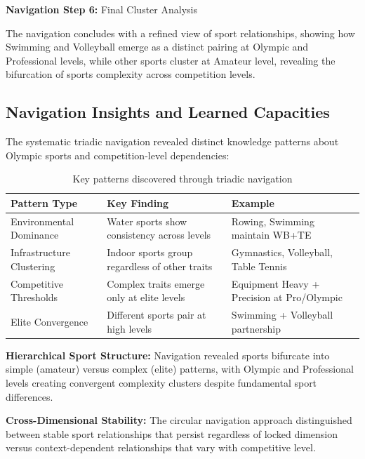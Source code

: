 \documentclass{article}
\begin{document}
\textbf{Navigation Step 6:} Final Cluster Analysis

The navigation concludes with a refined view of sport relationships, showing how Swimming and Volleyball emerge as a distinct pairing at Olympic and Professional levels, while other sports cluster at Amateur level, revealing the bifurcation of sports complexity across competition levels.

\subsection*{Navigation Insights and Learned Capacities}

The systematic triadic navigation revealed distinct knowledge patterns about Olympic sports and competition-level dependencies:

\begin{table}[h]
\centering
\begin{tabular}{|p{3cm}|p{4cm}|p{4cm}|}
\hline
\textbf{Pattern Type} & \textbf{Key Finding} & \textbf{Example} \\
\hline
Environmental Dominance & Water sports show consistency across levels & Rowing, Swimming maintain WB+TE \\
\hline
Infrastructure Clustering & Indoor sports group regardless of other traits & Gymnastics, Volleyball, Table Tennis \\
\hline
Competitive Thresholds & Complex traits emerge only at elite levels & Equipment Heavy + Precision at Pro/Olympic \\
\hline
Elite Convergence & Different sports pair at high levels & Swimming + Volleyball partnership \\
\hline
\end{tabular}
\caption{Key patterns discovered through triadic navigation}
\end{table}

\textbf{Hierarchical Sport Structure:} Navigation revealed sports bifurcate into simple (amateur) versus complex (elite) patterns, with Olympic and Professional levels creating convergent complexity clusters despite fundamental sport differences.

\textbf{Cross-Dimensional Stability:} The circular navigation approach distinguished between stable sport relationships that persist regardless of locked dimension versus context-dependent relationships that vary with competitive level.
\end{document}
